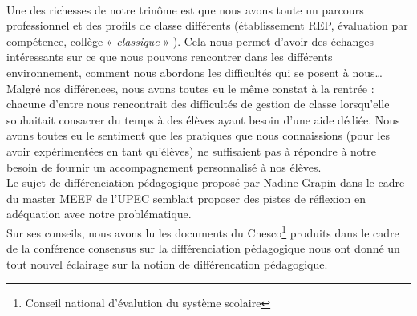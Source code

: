 \paragraph{} Une des richesses de notre trinôme est que nous avons toute un parcours professionnel et des profils de classe différents (établissement REP, évaluation par compétence, collège « \textit{classique} » ). Cela nous permet d'avoir des échanges intéressants sur ce que nous pouvons rencontrer dans les différents environnement, comment nous abordons les difficultés qui se posent à nous\ldots \\
Malgré nos différences, nous avons toutes eu le même constat à la rentrée : chacune d'entre nous rencontrait des difficultés de gestion de classe lorsqu'elle souhaitait consacrer du temps à des élèves ayant besoin d'une aide dédiée. Nous avons toutes eu le sentiment que les pratiques que nous connaissions (pour les avoir expérimentées en tant qu'élèves) ne suffisaient pas à répondre à notre besoin de fournir un accompagnement personnalisé à nos élèves.\\
Le sujet de différenciation pédagogique proposé par Nadine Grapin dans le cadre du master MEEF de l'UPEC semblait proposer des pistes de réflexion en adéquation avec notre problématique.\\
Sur ses conseils, nous avons lu les documents du Cnesco\footnote{Conseil national d'évalution du système scolaire} produits dans le cadre de la conférence consensus sur la différenciation pédagogique nous ont donné un tout nouvel éclairage sur la notion de différencation pédagogique.
